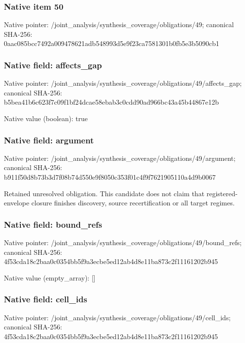 \documentclass[10pt,a4paper]{article}
\begin{document}
\subsubsection{Native item 50}
Native pointer: /joint\_\allowbreak{}analysis/synthesis\_\allowbreak{}coverage/obligations/49; canonical SHA-256: 0aac085bcc7492a009478621adb548993d5e9f23ca7581301b0fb5e3b5090cb1

\subsubsection{Native field: affects\_\allowbreak{}gap}
Native pointer: /joint\_\allowbreak{}analysis/synthesis\_\allowbreak{}coverage/obligations/49/affects\_\allowbreak{}gap; canonical SHA-256: b5bea41b6c623f7c09f1bf24dcae58ebab3c0cdd90ad966bc43a45b44867e12b

Native value (boolean): true

\subsubsection{Native field: argument}
Native pointer: /joint\_\allowbreak{}analysis/synthesis\_\allowbreak{}coverage/obligations/49/argument; canonical SHA-256: b911f50d8b73b3d7f08b74d550e9f8050c353f01c4f9f7621905110a4d9b0067

\begingroup\raggedright\sloppy Retained unresolved obligation. This candidate does not claim that registered-envelope closure finishes discovery,\allowbreak{} source recertification or all target regimes.\par\endgroup

\subsubsection{Native field: bound\_\allowbreak{}refs}
Native pointer: /joint\_\allowbreak{}analysis/synthesis\_\allowbreak{}coverage/obligations/49/bound\_\allowbreak{}refs; canonical SHA-256: 4f53cda18c2baa0c0354bb5f9a3ecbe5ed12ab4d8e11ba873c2f11161202b945

Native value (empty\_\allowbreak{}array): []

\subsubsection{Native field: cell\_\allowbreak{}ids}
Native pointer: /joint\_\allowbreak{}analysis/synthesis\_\allowbreak{}coverage/obligations/49/cell\_\allowbreak{}ids; canonical SHA-256: 4f53cda18c2baa0c0354bb5f9a3ecbe5ed12ab4d8e11ba873c2f11161202b945
\end{document}

